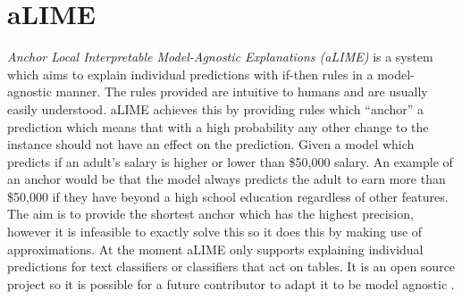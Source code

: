 \section{aLIME}
\emph{Anchor Local Interpretable Model-Agnostic Explanations (aLIME)} \cite{ribeiro2016nothing} is a system which aims to explain individual predictions with if-then rules in a model-agnostic manner. The rules provided are intuitive to humans and are usually easily understood. aLIME achieves this by providing rules which ``anchor'' a prediction which means that with a high probability any other change to the instance should not have an effect on the prediction. Given a model which predicts if an adult's salary is higher or lower than \$50,000 salary. An example of an anchor would be that the model always predicts the adult to earn more than \$50,000 if they have beyond a high school education regardless of other features.  The aim is to provide the shortest anchor which has the highest precision, however it is infeasible to exactly solve this so it does this by making use of approximations. At the moment aLIME only supports explaining individual predictions for text classifiers or classifiers that act on tables. It is an open source project so it is possible for a future contributor to adapt it to be model agnostic .